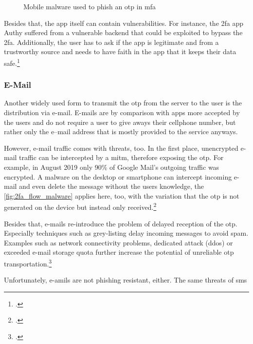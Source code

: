  \newpage
 
 \begin{figure}[hbt]
	\centering
	
	\caption[Mobile malware used to phish an \gls{otp} in \gls{mfa}]{Mobile malware used to phish an \gls{otp} in \gls{mfa}\footnotemark}
	\label{fig:2fa_flow_malware}
\end{figure}
 
 Besides that, the app itself can contain vulnerabilities. For instance, the \gls{2fa} app Authy suffered from a vulnerable backend that could be exploited to bypass the \gls{2fa}. Additionally, the user has to ask if the app is legitimate and from a trustworthy source and needs to have faith in the app that it keeps their data safe.\footcites[See][]{eset-bypass2fa}[See][]{sakurity-authy}
 
\subsubsection{E-Mail}

Another widely used form to transmit the \gls{otp} from the server to the user is the distribution via e-mail. E-mails are by comparison with apps more accepted by the users and do not require a user to give aways their cellphone number, but rather only the e--mail address that is mostly provided to the service anyways.

However, e-mail traffic comes with threats, too. In the first place, unencrypted e-mail traffic can be intercepted by a \gls{mitm}, therefore exposing the \gls{otp}. For example, in August 2019 only 90\% of Google Mail's outgoing traffic was encrypted. A malware on the desktop or smartphone can intercept incoming e-mail and even delete the message without the users knowledge, the \autoref{fig:2fa_flow_malware} applies here, too, with the variation that the \gls{otp} is not generated on the device but instead only received.\footcites[See][]{email-encryption}

Besides that, e-mails re-introduce the problem of delayed reception of the \gls{otp}. Especially techniques such as grey-listing delay incoming messages to avoid spam. Examples such as network connectivity problems, dedicated attack (\gls{ddos}) or exceeded e-mail storage quota further increase the potential of unreliable \gls{otp} transportation.\footcites[See][]{rfc6647}

Unfortunately, e-amils are not phishing resistant, either. The same threats of \gls{sms} 